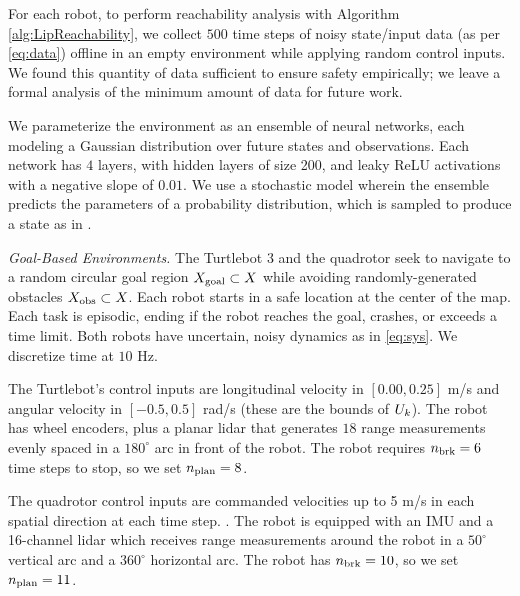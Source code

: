 For each robot, to perform reachability analysis with Algorithm \ref{alg:LipReachability}, we collect $500$ time steps of noisy state/input data (as per \eqref{eq:data}) offline in an empty environment while applying random control inputs.
We found this quantity of data sufficient to ensure safety empirically; we leave a formal analysis of the minimum amount of data for future work.

We parameterize the environment  as an ensemble of neural networks, each modeling a Gaussian distribution over future states and observations.
Each network has $4$ layers, with hidden layers of size 200, and leaky ReLU activations with a negative slope of $0.01$.
We use a stochastic model wherein the ensemble predicts the parameters of a probability distribution, which is sampled to produce a state as in \cite{chua2018deep}.


\textit{Goal-Based Environments.}
The Turtlebot 3 and the quadrotor seek to navigate to a random circular goal region $X_{\mathrm{\textnormal{goal}}} \subset X$ while avoiding randomly-generated obstacles $X_{\mathrm{\textnormal{obs}}} \subset X$. %
Each robot starts in a safe location at the center of the map.
Each task is episodic, ending if the robot reaches the goal, crashes, or exceeds a time limit.
Both robots have uncertain, noisy dynamics as in \eqref{eq:sys}.
We discretize time at $10$ Hz.

The Turtlebot's control inputs are longitudinal velocity in $[0.00,0.25]$ m/s and angular velocity in $[-0.5, 0.5]$ rad/s (these are the bounds of $U_k$).
The robot has wheel encoders, plus a planar lidar that generates $18$ range measurements evenly spaced in a $180^\circ$ arc in front of the robot.
The robot requires ${n_{\mathrm{\textnormal{brk}}}} = 6$ time steps to stop, so we set ${n_{\mathrm{\textnormal{plan}}}} = 8$.

The quadrotor control inputs are commanded velocities up to 5 m/s in each spatial direction at each time step.
. The robot is equipped with an IMU and a 16-channel lidar which receives range measurements around the robot in a $50^\circ$ vertical arc and a $360^\circ$ horizontal arc.
The robot has ${n_{\mathrm{\textnormal{brk}}}} = 10$, so we set ${n_{\mathrm{\textnormal{plan}}}} = 11$.

